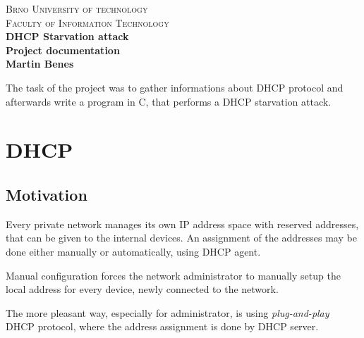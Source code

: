 \documentclass[10pt,a4paper,titlepage]{article}
\begin{document}
    \begin{titlepage}
    
    \begin{center}
    \textsc{\LARGE Brno University of technology}\\[0.5cm]
    \textsc{\large Faculty of Information Technology}\\[8cm]
    
    { \huge \bfseries DHCP Starvation attack}\\[0.3cm]
    { \Large \bfseries Project documentation}\\[0.5cm]
    { \bfseries Martin Benes}\\
    
    \end{center}
    
    \end{titlepage}
    \newpage
    
    
    
    The task of the project was to gather informations about DHCP protocol and
    afterwards write a program in C, that performs a DHCP starvation attack.
    
    
    
    \section*{DHCP}
    
    
    \subsection*{Motivation}
    Every private network manages its own IP address space with reserved addresses, that
    can be given to the internal devices. An assignment of the addresses may be
    done either manually or automatically, using DHCP agent.
    
    Manual configuration forces the network administrator to manually setup the
    local address for every device, newly connected to the network.
    
    The more pleasant way, especially for administrator, is using {\it plug-and-play}
    DHCP protocol, where the address assignment is done by DHCP server.
    \cite{computernetworking} \cite{pocitacovesite}
    
\end{document}
